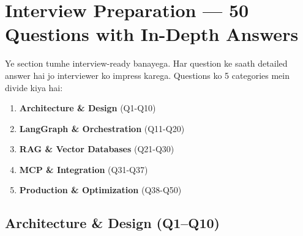\documentclass[12pt, a4paper]{article}
\begin{document}
\newpage
\section{Interview Preparation --- 50 Questions with In-Depth Answers}

\begin{storybox}
Ye section tumhe interview-ready banayega. Har question ke saath detailed answer hai jo interviewer ko impress karega. Questions ko 5 categories mein divide kiya hai:
\begin{enumerate}
\item \textbf{Architecture \& Design} (Q1-Q10)
\item \textbf{LangGraph \& Orchestration} (Q11-Q20)
\item \textbf{RAG \& Vector Databases} (Q21-Q30)
\item \textbf{MCP \& Integration} (Q31-Q37)
\item \textbf{Production \& Optimization} (Q38-Q50)
\end{enumerate}
\end{storybox}

\subsection{Architecture \& Design (Q1--Q10)}
\end{document}
